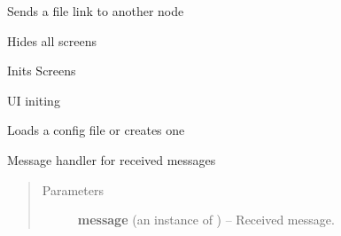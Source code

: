 \documentclass[letterpaper,10pt,english]{sphinxmanual}
\begin{document}
\begin{fulllineitems}

\begin{fulllineitems}
\label{api:wos.GUI.HandleFileSend}
Sends a file link to another node

\end{fulllineitems}


\begin{fulllineitems}
\label{api:wos.GUI.HideScreens}
Hides all screens

\end{fulllineitems}


\begin{fulllineitems}
\label{api:wos.GUI.InitScreens}
Inits Screens

\end{fulllineitems}


\begin{fulllineitems}
\label{api:wos.GUI.InitUI}
UI initing

\end{fulllineitems}


\begin{fulllineitems}
\label{api:wos.GUI.LoadConfig}
Loads a config file or creates one

\end{fulllineitems}


\begin{fulllineitems}
\label{api:wos.GUI.MessageHandler}
Message handler for received messages
\begin{quote}\begin{description}
\item[{Parameters}] \leavevmode
\textbf{message} (an instance of {\hyperref[api:swnp.Message]{}}) -- Received message.


\end{description}
\end{quote}
\end{fulllineitems}
\end{fulllineitems}
\end{document}
